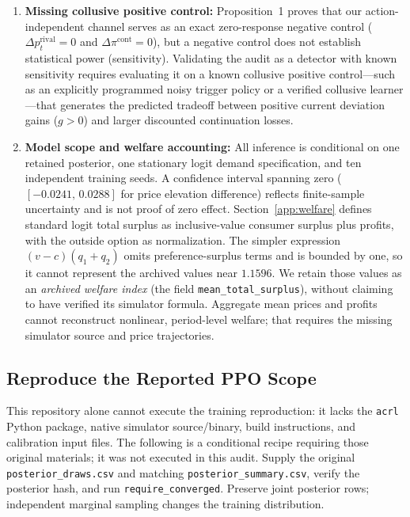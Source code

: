 \documentclass{article}
\begin{document}
\begin{enumerate}
\item \textbf{Missing collusive positive control:} Proposition~1 proves that our action-independent channel serves as an exact zero-response negative control ($\Delta p_t^{\mathrm{rival}}=0$ and $\Delta\pi^{\mathrm{cont}}=0$), but a negative control does not establish statistical power (sensitivity). Validating the audit as a detector with known sensitivity requires evaluating it on a known collusive positive control---such as an explicitly programmed noisy trigger policy or a verified collusive learner---that generates the predicted tradeoff between positive current deviation gains ($g>0$) and larger discounted continuation losses.
\item \textbf{Model scope and welfare accounting:} All inference is conditional on one retained posterior, one stationary logit demand specification, and ten independent training seeds. A confidence interval spanning zero ($[-0.0241,\,0.0288]$ for price elevation difference) reflects finite-sample uncertainty and is not proof of zero effect. Section~\ref{app:welfare} defines standard logit total surplus as inclusive-value consumer surplus plus profits, with the outside option as normalization. The simpler expression $(v-c)(q_1+q_2)$ omits preference-surplus terms and is bounded by one, so it cannot represent the archived values near $1.1596$. We retain those values as an \emph{archived welfare index} (the field \texttt{mean\_total\_surplus}), without claiming to have verified its simulator formula. Aggregate mean prices and profits cannot reconstruct nonlinear, period-level welfare; that requires the missing simulator source and price trajectories.
\end{enumerate}

\subsection{Reproduce the Reported PPO Scope}

This repository alone cannot execute the training reproduction: it lacks the \texttt{acrl} Python package, native simulator source/binary, build instructions, and calibration input files. The following is a conditional recipe requiring those original materials; it was not executed in this audit. Supply the original \texttt{posterior\_draws.csv} and matching \texttt{posterior\_summary.csv}, verify the posterior hash, and run \texttt{require\_converged}. Preserve joint posterior rows; independent marginal sampling changes the training distribution.
\end{document}
